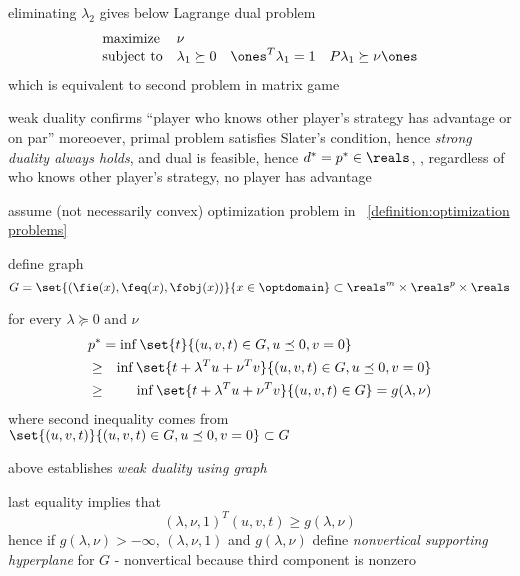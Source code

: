 \documentclass[17pt,landscape]{foils}
\begin{document}
{\vitem
	eliminating $\lambda_2$ gives
	below Lagrange dual problem
	$$
		\begin{array}{ll}
			\mbox{maximize} &
				\nu
			\\
			\mbox{subject to} &
				\lambda_1 \succeq 0 \quad \ones^T\lambda_1 = 1 \quad P\lambda_1 \succeq \nu \ones
		\end{array}
	$$
	which is equivalent to second problem in matrix game


\vitem
	weak duality confirms ``player who knows other player's strategy has advantage or on par''
\vitem
	moreoever,
	primal problem satisfies Slater's condition, hence \emph{strong duality {always} holds},
	and dual is feasible,
	hence $d^\ast=p^\ast\in\reals$,
	\ie, regardless of who knows other player's strategy,
	no player has advantage

\eit



\bit
\item
	assume (not necessarily convex) optimization problem
	in ~\ref{definition:optimization problems}

\item
	define graph
	$$
		G = \set{(\fie(x), \feq(x), \fobj(x))}{x\in\optdomain}
		\subset \reals^m \times \reals^p \times \reals
	$$
%

\item
	for every $\lambda\succeq 0$ and $\nu$
	\begin{eqnarray*}
		\lefteqn{
			p^\ast = \inf\set{t}{(u,v,t) \in G, u\preceq 0, v = 0}
		}
		\\
		&
		\geq
		&
			\inf\set{t+\lambda^Tu + \nu^T v}{(u,v,t) \in G, u\preceq 0, v = 0}
		\\
		&
		\geq
		&
			\inf\set{t+\lambda^Tu + \nu^T v}{(u,v,t) \in G}
		=
			g(\lambda,\nu)
	\end{eqnarray*}
	where second inequality comes from
	$
		\set{(u,v,t)}{(u,v,t) \in G, u\preceq 0, v = 0} \subset G
	$

\item
	above establishes \emph{weak duality}
	\emph{using graph}

\item
	last equality implies that
	$$(\lambda, \nu, 1)^T (u,v,t) \geq g(\lambda,\nu)$$
	hence if $g(\lambda,\nu) > -\infty$,
	$(\lambda, \nu, 1)$ and $g(\lambda,\nu)$ define
	\emph{nonvertical}
	\emph{supporting hyperplane} for $G$
	- nonvertical because third component is nonzero
\eit

}
\end{document}
